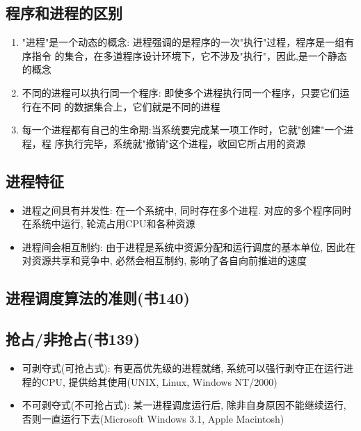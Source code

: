 \documentclass[a4paper, UTF8]{article}
\begin{document}
\subsection{程序和进程的区别}
\begin{enumerate}
\item "进程"是一个动态的概念: 进程强调的是程序的一次"执行"过程，程序是一组有序指令
的集合，在多道程序设计环境下，它不涉及"执行"，因此,是一个静态的概念
\item 不同的进程可以执行同一个程序: 即使多个进程执行同一个程序，只要它们运行在不同
的数据集合上，它们就是不同的进程
\item 每一个进程都有自己的生命期:当系统要完成某一项工作时，它就"创建"一个进程，程
序执行完毕，系统就"撤销"这个进程，收回它所占用的资源
\end{enumerate}

\subsection{进程特征}
\begin{itemize}
\item 进程之间具有并发性: 在一个系统中, 同时存在多个进程. 对应的多个程序同时在系统中运行, 轮流占用CPU和各种资源
\item 进程间会相互制约: 由于进程是系统中资源分配和运行调度的基本单位, 因此在对资源共享和竞争中, 必然会相互制约, 影响了各自向前推进的速度
\end{itemize}

\subsection{进程调度算法的准则(书140)}
\subsection{抢占/非抢占(书139)}
\begin{itemize}
\item 可剥夺式(可抢占式): 有更高优先级的进程就绪, 系统可以强行剥夺正在运行进程的CPU, 提供给其使用(UNIX, Linux, Windows NT/2000)
\item 不可剥夺式(不可抢占式): 某一进程调度运行后, 除非自身原因不能继续运行, 否则一直运行下去(Microsoft Windows 3.1, Apple Macintosh)
\end{itemize}
\end{document}
